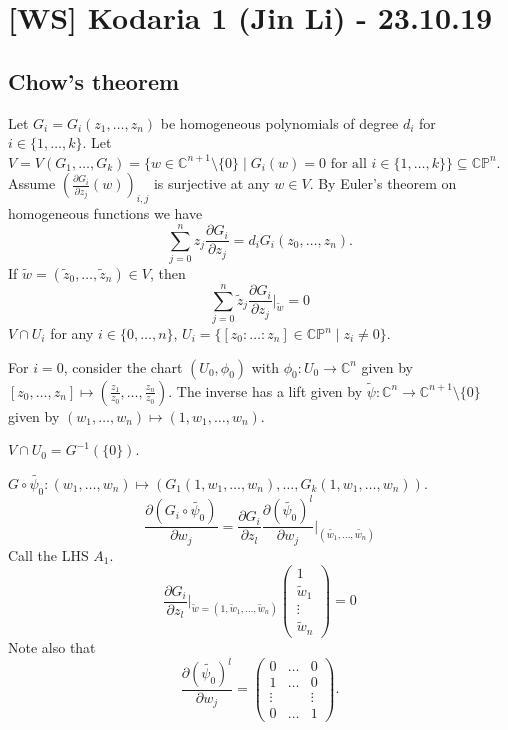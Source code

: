 \documentclass[11pt,A4]{article}
\theoremstyle{plain}
\theoremstyle{definition}
\theoremstyle{remark}
\newcommand{\1}{\mathbbm{1}}
\newcommand{\C}{\mathbb{C}}
\newcommand{\CP}{\mathbb{CP}}
\begin{document}
\section{[WS] Kodaria 1 (Jin Li) - 23.10.19}

\subsection{Chow's theorem}

Let $G_{i}=G_{i}(z_{1},\ldots,z_{n})$ be homogeneous polynomials of degree $d_{i}$ for $i\in \{1,\ldots,k\}$.
Let $V=V(G_{1},\ldots,G_{k})=\{w\in \C^{n+1}\setminus \{0 \}\mid G_{i}(w)=0 \text{ for all }i\in \{1,\ldots,k\}\}\subseteq \CP^{n}$.
Assume $(\frac{\partial G_{i}}{\partial z_{j}}(w))_{i,j}$ is surjective at any $w\in V$.
By Euler's theorem on homogeneous functions we have
\[ \sum_{j=0}^{n}z_{j}\frac{\partial G_{i}}{\partial z_{j}}=d_{i}G_{i}(z_{0},\ldots,z_{n}). \]
If $\tilde{w}=(\tilde{z}_{0},\ldots,\tilde{z}_{n})\in V$, then
\[ \sum_{j=0}^{n}\tilde{z}_{j}\frac{\partial G_{i}}{\partial z_{j}}|_{\tilde{w}}=0\]
$V\cap U_{i}$ for any $i\in \{0,\ldots,n\}$, $U_{i}=\{[z_{0}:\ldots:z_{n}]\in \CP^{n}\mid z_{i}\neq 0\}$.

For $i=0$, consider the chart $(U_{0},\phi_{0})$ with $\phi_{0}\colon U_{0}\to \C^{n}$ given by $[z_{0},\ldots,z_{n}]\mapsto (\frac{z_{1}}{z_{0}},\ldots,\frac{z_{n}}{z_{0}})$.
The inverse has a lift given by $\tilde{\psi}\colon \C^{n}\to \C^{n+1}\setminus \{0\}$ given by $(w_{1},\ldots,w_{n})\mapsto (1,w_{1},\ldots,w_{n})$.
\begin{center}
\end{center}
$V\cap U_{0}=G^{-1}(\{0\})$.

$G\circ \tilde{\psi_{0}}\colon (w_{1},\ldots,w_{n})\mapsto (G_{1}(1,w_{1},\ldots,w_{n}),\ldots,G_{k}(1,w_{1},\ldots,w_{n}))$.
\[ \frac{\partial (G_{i}\circ \tilde{\psi_{0}})}{\partial w_{j}} = \frac{\partial G_{i}}{\partial z_{l}}\frac{\partial(\tilde{\psi_{0}})^{l}}{\partial w_{j}}|_{(\tilde{w_{1}},\ldots,\tilde{w_{n}})} \]
Call the LHS $A_{1}$.
\begin{equation}
    \frac{\partial G_{i}}{\partial z_{l}}|_{\tilde{w}=(1,\tilde{w}_{1},\ldots,\tilde{w}_{n})}\begin{pmatrix} 1 \\ \tilde{w}_{1} \\ \vdots \\ \tilde{w}_{n} \end{pmatrix} = 0
\end{equation}
Note also that
\[\frac{\partial (\tilde{\psi_{0}})^{l}}{\partial w_{j}}=\begin{pmatrix} 0 & \ldots & 0 \\ 1 & \ldots & 0\\ \vdots & & \vdots \\ 0 & \ldots & 1 \end{pmatrix}.\]
\end{document}
